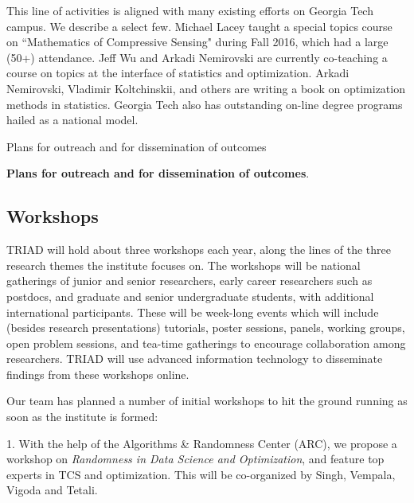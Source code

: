 \documentclass[12pt]{article}
\begin{document}
This line of activities is aligned with many existing efforts on Georgia Tech campus.
We describe a select few.
Michael Lacey taught a special topics course on
``Mathematics of Compressive Sensing" during  Fall 2016, which had a large (50+) attendance.
Jeff Wu and Arkadi Nemirovski are currently co-teaching a course  on topics at the interface of statistics and optimization.
Arkadi Nemirovski, Vladimir Koltchinskii, and others are writing a book on optimization methods in statistics. Georgia Tech also has outstanding on-line degree programs hailed as
a national model.


\clearpage

\begin{center}
Plans for outreach and for dissemination of outcomes
\end{center}

{\bf Plans for outreach and for dissemination of outcomes}.

\subsection{Workshops}
\label{sec:workshops}
TRIAD will hold about three workshops each year, along the lines of the three research
themes the institute focuses on. The workshops will be national gatherings of junior and senior researchers, early career researchers such as postdocs, and graduate and senior
undergraduate students, with additional international participants.
These will be week-long events which will include (besides research presentations)
tutorials, poster sessions, panels, working groups, open problem sessions, and
tea-time gatherings to encourage collaboration among researchers.
TRIAD will use advanced information technology to disseminate findings from these workshops online.

Our team has planned a number of initial workshops to hit the ground running as soon as the
institute is formed:

1. With the help of the Algorithms \& Randomness Center (ARC), we propose a workshop
on {\em Randomness in Data Science and Optimization}, and feature top experts in
TCS and optimization. This will be co-organized by
Singh, Vempala, Vigoda and Tetali.
\end{document}
